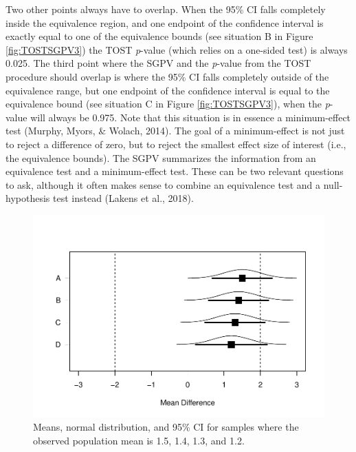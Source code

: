 \documentclass[floatsintext,man]{apa6}
\theoremstyle{definition}
\theoremstyle{definition}
\theoremstyle{definition}
\theoremstyle{remark}
\begin{document}
Two other points always have to overlap. When the 95\% CI falls
completely inside the equivalence region, and one endpoint of the
confidence interval is exactly equal to one of the equivalence bounds
(see situation B in Figure \ref{fig:TOSTSGPV3}) the TOST \emph{p}-value
(which relies on a one-sided test) is always 0.025. The third point
where the SGPV and the \emph{p}-value from the TOST procedure should
overlap is where the 95\% CI falls completely outside of the equivalence
range, but one endpoint of the confidence interval is equal to the
equivalence bound (see situation C in Figure \ref{fig:TOSTSGPV3}), when
the \emph{p}-value will always be 0.975. Note that this situation is in
essence a minimum-effect test (Murphy, Myors, \& Wolach, 2014). The goal
of a minimum-effect is not just to reject a difference of zero, but to
reject the smallest effect size of interest (i.e., the equivalence
bounds). The SGPV summarizes the information from an equivalence test
and a minimum-effect test. These can be two relevant questions to ask,
although it often makes sense to combine an equivalence test and a
null-hypothesis test instead (Lakens et al., 2018).

\begin{figure}
\centering
\includegraphics{manuscript_files/figure-latex/TOSTSGPV4-1.pdf}
\caption{\label{fig:TOSTSGPV4}Means, normal distribution, and 95\% CI for
samples where the observed population mean is 1.5, 1.4, 1.3, and 1.2.}
\end{figure}
\end{document}
